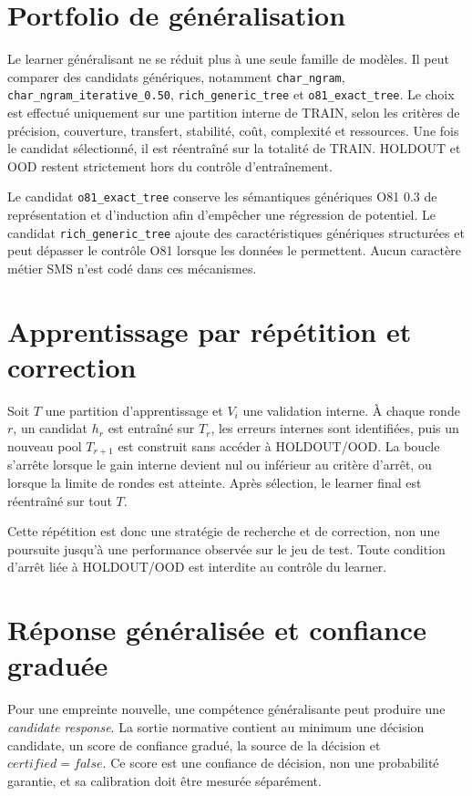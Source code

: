 \documentclass[11pt,a4paper]{report}
\begin{document}
\section{Portfolio de généralisation}
Le learner généralisant ne se réduit plus à une seule famille de modèles. Il peut comparer des candidats génériques, notamment \texttt{char\_ngram}, \texttt{char\_ngram\_iterative\_0.50}, \texttt{rich\_generic\_tree} et \texttt{o81\_exact\_tree}. Le choix est effectué uniquement sur une partition interne de TRAIN, selon les critères de précision, couverture, transfert, stabilité, coût, complexité et ressources. Une fois le candidat sélectionné, il est réentraîné sur la totalité de TRAIN. HOLDOUT et OOD restent strictement hors du contrôle d'entraînement.

Le candidat \texttt{o81\_exact\_tree} conserve les sémantiques génériques O81 0.3 de représentation et d'induction afin d'empêcher une régression de potentiel. Le candidat \texttt{rich\_generic\_tree} ajoute des caractéristiques génériques structurées et peut dépasser le contrôle O81 lorsque les données le permettent. Aucun caractère métier SMS n'est codé dans ces mécanismes.

\section{Apprentissage par répétition et correction}
Soit $T$ une partition d'apprentissage et $V_i$ une validation interne. À chaque ronde $r$, un candidat $h_r$ est entraîné sur $T_r$, les erreurs internes sont identifiées, puis un nouveau pool $T_{r+1}$ est construit sans accéder à HOLDOUT/OOD. La boucle s'arrête lorsque le gain interne devient nul ou inférieur au critère d'arrêt, ou lorsque la limite de rondes est atteinte. Après sélection, le learner final est réentraîné sur tout $T$.

Cette répétition est donc une stratégie de recherche et de correction, non une poursuite jusqu'à une performance observée sur le jeu de test. Toute condition d'arrêt liée à HOLDOUT/OOD est interdite au contrôle du learner.

\section{Réponse généralisée et confiance graduée}
Pour une empreinte nouvelle, une compétence généralisante peut produire une \emph{candidate response}. La sortie normative contient au minimum une décision candidate, un score de confiance gradué, la source de la décision et $certified=false$. Ce score est une confiance de décision, non une probabilité garantie, et sa calibration doit être mesurée séparément.
\end{document}
